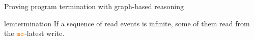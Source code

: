 \begin{frame}{Proving program termination with graph-based reasoning}
  \vspace{-0.5cm}
  \begin{center}
    

    \pause 
    \begin{restatable}{lem}{termination}
      If a sequence of read events is infinite, some of them read from the $\lMO$-latest write.
    \end{restatable}

  \end{center}

  \vspace{-1cm}
  
\end{frame}
